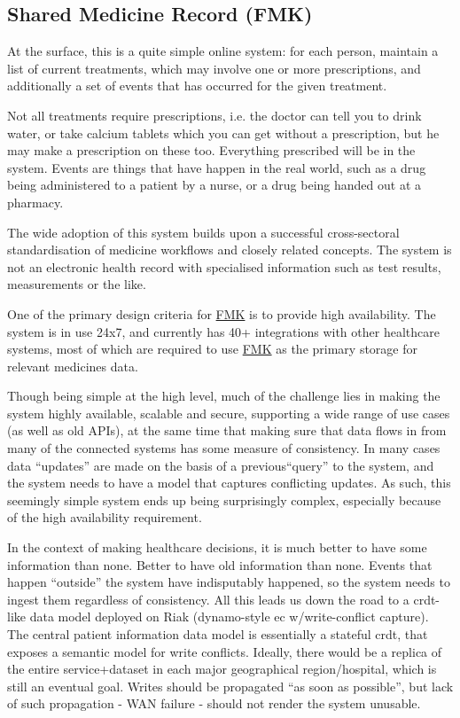 \subsection{Shared Medicine Record (FMK)}
At the surface, this is a quite simple online system: for each person, maintain a list of current treatments, which may involve one or more prescriptions, and additionally a set of events that has occurred for the given treatment.

Not all treatments require prescriptions, i.e. the doctor can tell you to drink water, or take calcium tablets which you can get without a prescription, but he may make a prescription on these too. Everything prescribed will be in the system. Events are things that have happen in the real world, such as a drug being administered to a patient by a nurse, or a drug being handed out at a pharmacy. 

The wide adoption of this system builds upon a successful cross-sectoral standardisation of medicine workflows and closely related concepts. The system is not an electronic health record with specialised information such as test results, measurements or the like.

One of the primary design criteria for \href{https://www.trifork.com/news/a-prestigious-prize-trifork-public}{FMK} is to provide high availability. The system is in use 24x7, and currently has 40+ integrations with other healthcare systems, most of which are required to use \href{https://www.trifork.com/news/a-prestigious-prize-trifork-public}{FMK} as the primary storage for relevant medicines data. 

Though being simple at the high level, much of the challenge lies in making the system highly available, scalable and secure, supporting a wide range of use cases (as well as old APIs), at the same time that making sure that data flows in from many of the connected systems has some measure of consistency. In many cases data \textquotedblleft updates\textquotedblright{} are made on the basis of a previous\textquotedblleft query\textquotedblright{} to the system, and the system needs to have a model that captures conflicting updates. As such, this seemingly simple system ends up being surprisingly complex, especially because of the high availability requirement. 

In the context of making healthcare decisions, it is much better to have some information than none. Better to have old information than none. Events that happen \textquotedblleft outside\textquotedblright{} the system have indisputably happened, so the system needs to ingest them regardless of consistency. All this leads us down the road to a \gls{crdt}-like data model deployed on Riak (dynamo-style \gls{ec} w/write-conflict capture). The central patient information data model is essentially a stateful \gls{crdt}, that exposes a semantic model for write conflicts. Ideally, there would be a replica of the entire service+dataset in each major geographical region/hospital, which is still an eventual goal. Writes should be propagated \textquotedblleft as soon as possible\textquotedblright , but lack of such propagation - WAN failure - should not render the system unusable.


